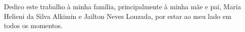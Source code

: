 \begin{dedicatoria}
Dedico este trabalho à minha família, principalmente à minha mãe e pai, Maria Helieni da Silva Alkimin e Jailton Neves Louzada, por estar ao meu lado em todos os momentos.
\end{dedicatoria}